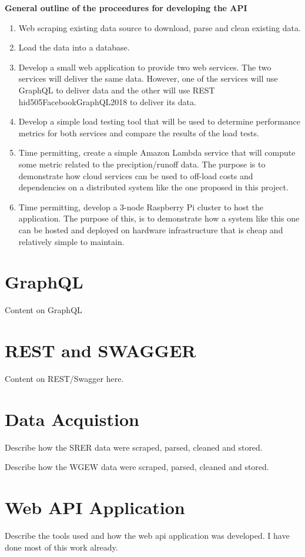 \textbf{General outline of the proceedures for developing the API}
\begin{enumerate}
\item Web scraping existing data source to download, parse and clean existing data.
\item Load the data into a database.  
\item Develop a small web application to provide two web services.  The two 
services will deliver the same data.  However, one of the services will use 
GraphQL to deliver data and the other will use REST\cite{hid505swaggerio2018} hid505FacebookGraphQL2018
to deliver its data. 
\item Develop a simple load testing tool that will be used to determine 
performance metrics for both services and compare the results of the load tests.
\item Time permitting, create a simple Amazon Lambda service that will compute 
some metric related to the preciption/runoff data.  The purpose is to 
demonstrate how cloud services can be used to off-load costs and dependencies 
on a distributed system like the one proposed in this project.
\item Time permitting, develop a 3-node Raspberry Pi cluster to host the 
application.  The purpose of this, is to demonstrate how a system like this 
one can be hosted and deployed on hardware infrastructure that is cheap and 
relatively simple to maintain.
\end{enumerate}

\section{GraphQL}
Content on GraphQL

\section{REST and SWAGGER}
Content on REST/Swagger here.

\section{Data Acquistion}
Describe how the SRER data were scraped, parsed, cleaned and stored.

Describe how the WGEW data were scraped, parsed, cleaned and stored.

\section{Web API Application}
Describe the tools used and how the web api application was developed.
I have done most of this work already.

